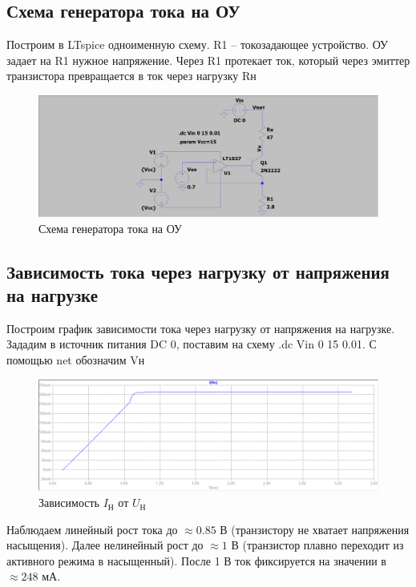 \documentclass[a4paper, 12pt]{article}
\begin{document}
    \subsection{Схема генератора тока на ОУ}
    Построим в LTspice одноименную схему. R1 -- токозадающее устройство.
    ОУ задает на R1 нужное напряжение. Через R1 протекает ток, который через
    эмиттер транзистора превращается в ток через нагрузку Rн
    \begin{figure}[H]
        \centering
        \includegraphics[scale=0.22]{scheme3.png}
        \captionsetup{skip=0pt}
        \caption{Схема генератора тока на ОУ}
        \label{fig:scheme3}
    \end{figure}


    \subsection{Зависимость тока через нагрузку от напряжения на нагрузке}
    Построим график зависимости тока через нагрузку от напряжения на нагрузке.
    Зададим в источник питания DC 0, поставим на схему .dc Vin 0 15 0.01.
    С помощью net обозначим Vн
    \begin{figure}[H]
        \centering
        \includegraphics[scale=0.46]{3task_Iн(Vн).png}
        \captionsetup{skip=0pt}
        \caption{Зависимость $I_\text{Н}$ от $U_\text{Н}$}
        \label{fig:3task_InVn}
    \end{figure}
    \noindent Наблюдаем линейный рост тока до $\approx0.85$ В (транзистору не хватает напряжения насыщения).
    Далее нелинейный рост до $\approx1$ В (транзистор плавно переходит из активного режима в насыщенный).
    После 1 В ток фиксируется на значении в $\approx248$ мА.
\end{document}
